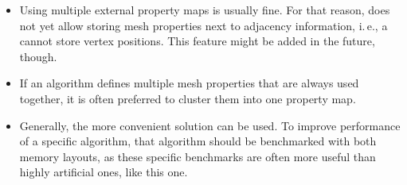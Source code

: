 \begin{itemize}
  \item Using multiple external property maps is usually fine.
  For that reason,  does not yet allow storing mesh properties next to adjacency information, i.\,e., a  cannot store vertex positions.
  This feature might be added in the future, though.
  \item If an algorithm defines multiple mesh properties that are always used together, it is often preferred to cluster them into one property map.
  \item Generally, the more convenient solution can be used.
  To improve performance of a specific algorithm, that algorithm should be benchmarked with both memory layouts, as these specific benchmarks are often more useful than highly artificial ones, like this one.
\end{itemize}
